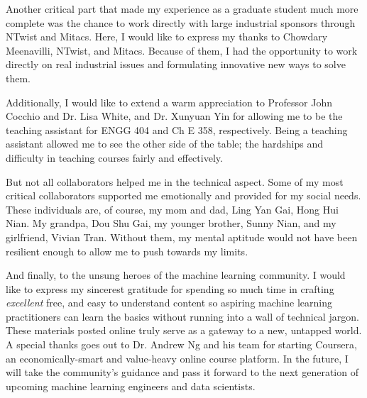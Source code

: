 \documentclass[12pt]{report}
\begin{document}
Another critical part that made my experience as a graduate student much more complete was the chance to work directly with large industrial sponsors through NTwist and Mitacs.  Here, I would like to express my thanks to Chowdary Meenavilli, NTwist, and Mitacs.  Because of them, I had the opportunity to work directly on real industrial issues and formulating innovative new ways to solve them.

Additionally, I would like to extend a warm appreciation to Professor John Cocchio and Dr. Lisa White, and Dr. Xunyuan Yin for allowing me to be the teaching assistant for ENGG 404 and Ch E 358, respectively.  Being a teaching assistant allowed me to see the other side of the table; the hardships and difficulty in teaching courses fairly and effectively.

But not all collaborators helped me in the technical aspect.  Some of my most critical collaborators supported me emotionally and provided for my social needs.  These individuals are, of course, my mom and dad, Ling Yan Gai, Hong Hui Nian.  My grandpa, Dou Shu Gai, my younger brother, Sunny Nian, and my girlfriend, Vivian Tran.  Without them, my mental aptitude would not have been resilient enough to allow me to push towards my limits.

And finally, to the unsung heroes of the machine learning community.  I would like to express my sincerest gratitude for spending so much time in crafting \textit{excellent} free, and easy to understand content so aspiring machine learning practitioners can learn the basics without running into a wall of technical jargon.  These materials posted online truly serve as a gateway to a new, untapped world. A special thanks goes out to Dr. Andrew Ng and his team for starting Coursera, an economically-smart and value-heavy online course platform. In the future, I will take the community's guidance and pass it forward to the next generation of upcoming machine learning engineers and data scientists.
\end{document}
